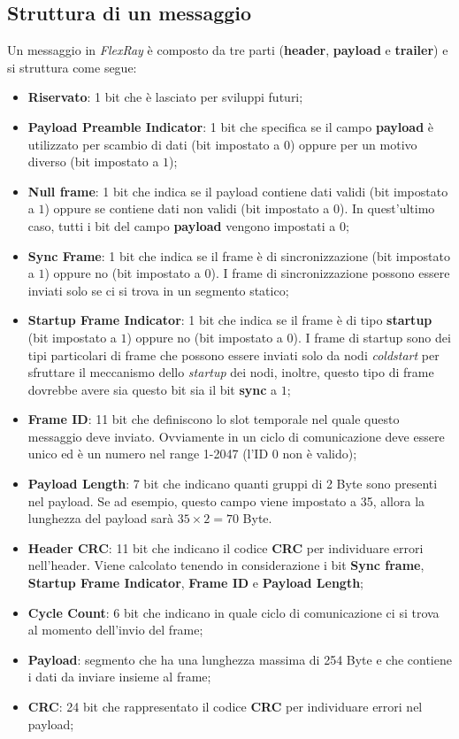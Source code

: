 \subsection{Struttura di un messaggio}
Un messaggio in \emph{FlexRay} è composto da tre parti (\textbf{header}, \textbf{payload} e \textbf{trailer}) e si struttura come segue:
\begin{itemize}
    \item \textbf{Riservato}: 1 bit che è lasciato per sviluppi futuri;
    \item \textbf{Payload Preamble Indicator}:  1 bit che specifica se il campo \textbf{payload} è utilizzato per scambio di dati (bit impostato a $0$) oppure per un motivo diverso (bit impostato a $1$);
    \item \textbf{Null frame}: 1 bit che indica se il payload contiene dati validi (bit impostato a $1$) oppure se contiene dati non validi (bit impostato a $0$). In quest'ultimo caso, tutti i bit del campo \textbf{payload} vengono impostati a 0;
    \item \textbf{Sync Frame}: 1 bit che indica se il frame è di sincronizzazione (bit impostato a $1$) oppure no (bit impostato a $0$). I frame di sincronizzazione possono essere inviati solo se ci si trova in un segmento statico;
    \item \textbf{Startup Frame Indicator}: 1 bit che indica se il frame è di tipo \textbf{startup} (bit impostato a $1$) oppure no (bit impostato a $0$). I frame di startup sono dei tipi particolari di frame che possono essere inviati solo da nodi \emph{coldstart} per sfruttare il meccanismo dello \emph{startup} dei nodi, inoltre, questo tipo di frame dovrebbe avere sia questo bit sia il bit \textbf{sync} a $1$;
    \item \textbf{Frame ID}: 11 bit che definiscono lo slot temporale nel quale questo messaggio deve inviato. Ovviamente in un ciclo di comunicazione deve essere unico ed è un numero nel range 1-2047 (l'ID 0 non è valido);
    \item \textbf{Payload Length}: 7 bit che indicano quanti gruppi di 2 Byte sono presenti nel payload. Se ad esempio, questo campo viene impostato a 35, allora la lunghezza del payload sarà $35\times 2 = 70$ Byte.
    \item \textbf{Header CRC}: 11 bit che indicano il codice \textbf{CRC} per individuare errori nell'header. Viene calcolato tenendo in considerazione i bit \textbf{Sync frame}, \textbf{Startup Frame Indicator}, \textbf{Frame ID} e \textbf{Payload Length};
    \item \textbf{Cycle Count}: 6 bit che indicano in quale ciclo di comunicazione ci si trova al momento dell'invio del frame;
    \item \textbf{Payload}: segmento che ha una lunghezza massima di 254 Byte e che contiene i dati da inviare insieme al frame;
    \item \textbf{CRC}: 24 bit che rappresentato il codice \textbf{CRC} per individuare errori nel payload;
\end{itemize}

